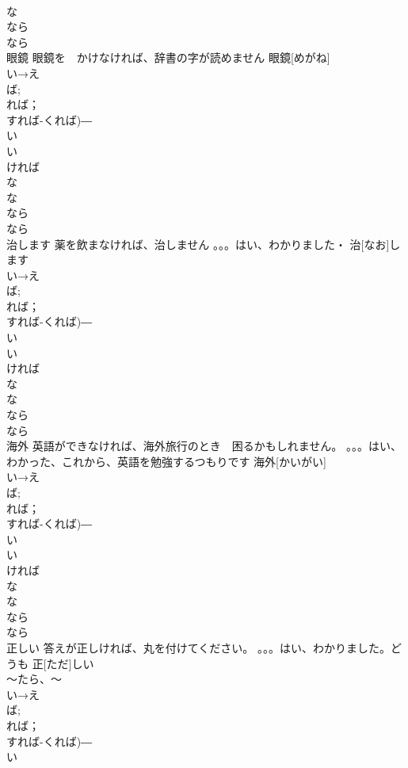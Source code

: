 \documentclass[8pt]{extreport}
\begin{document}
\begin{CJK}{UTF8}{min}
\\	な
\\	なら　
\\	なら
\\	眼鏡	眼鏡を　かけなければ、辞書の字が読めません	眼鏡[めがね]			
\\	い→え
\\	ば;
\\	れば；
\\	すれば-くれば)―　
\\	い
\\	い　
\\	ければ　
\\	な 
\\	な
\\	なら　
\\	なら
\\	治します	薬を飲まなければ、治しません 。。。はい、わかりました・	治[なお]します			
\\	い→え
\\	ば;
\\	れば；
\\	すれば-くれば)―　
\\	い
\\	い　
\\	ければ　
\\	な 
\\	な
\\	なら　
\\	なら
\\	海外	英語ができなければ、海外旅行のとき　困るかもしれません。 。。。はい、わかった、これから、英語を勉強するつもりです	海外[かいがい]			
\\	い→え
\\	ば;
\\	れば；
\\	すれば-くれば)―　
\\	い
\\	い　
\\	ければ　
\\	な 
\\	な
\\	なら　
\\	なら
\\	正しい	答えが正しければ、丸を付けてください。 。。。はい、わかりました。どうも	正[ただ]しい			
\\	～たら、～
\\	い→え
\\	ば;
\\	れば；
\\	すれば-くれば)―　
\\	い

\end{CJK}
\end{document}

